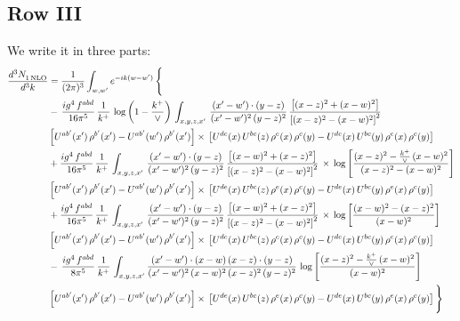 \documentclass[9pt]{article}
\numberwithin{equation}{section}
\begin{document}
\subsection{Row III}
We write it in three parts:
\begin{align}
   \frac{d^{3}N_{1\,\rm NLO}^{\rm}}{d^{3}k}  & =  \frac{1}{(2\pi)^{3}}  \int_{w, w^\prime} e^{-ik(w-w^\prime)}\, \Bigg\{\notag \\
& -\,\frac{ig^{4}\,f^{abd}}{16\pi^{5}}\,\frac{1}{k^{+}}\,\log{\left(1-\frac{k^{+}}{\vee}\right)}\,\int_{x,y,z,x'}\, \frac{(x'-w')\cdot (y-z)}{(x'-w')^{2}\,(y-z)^{2}}\,\frac{\left[(x-z)^{2}+(x-w)^{2}\right]}{\left[(x-z)^{2}-(x-w)^{2}\right]^{2}}\notag \\ & \left[U^{ab'}(x')\,\rho^{b'}(x')-U^{ab'}(w')\, \rho^{b'}(x')\right]\times\, \left[U^{de}(x)\,U^{bc}(z)\, \rho^{e}(x)\,\rho^{c}(y)-U^{de}(x)\,U^{bc}(y)\,\rho^{e}(x)\,\rho^{c}(y)\right] \notag \\
&  +\frac{ig^{4}\,f^{abd}}{16\pi^{5}}\, \frac{1}{k^{+}}\,\int_{x,y,z,x'}\, \frac{(x'-w')\cdot (y-z)}{(x'-w')^{2}\,(y-z)^{2}}\, \frac{\left[(x-w)^{2}+(x-z)^{2}\right]}{\left[(x-z)^{2}-(x-w)^{2}\right]^{2}}\, \times\, \log{\left[\frac{(x-z)^{2}-\frac{k^{+}}{\vee}\,(x-w)^{2}}{(x-z)^{2}-(x-w)^{2}}\right]}\notag \\ & \left[U^{ab'}(x')\,\rho^{b'}(x')-U^{ab'}(w')\, \rho^{b'}(x')\right]\times\, \left[U^{de}(x)\,U^{bc}(z)\, \rho^{e}(x)\,\rho^{c}(y)-U^{de}(x)\,U^{bc}(y)\,\rho^{e}(x)\,\rho^{c}(y)\right] \notag \\
&  +\frac{ig^{4}\,f^{abd}}{16\pi^{5}}\, \frac{1}{k^{+}}\,\int_{x,y,z,x'}\, \frac{(x'-w')\cdot (y-z)}{(x'-w')^{2}\,(y-z)^{2}}\, \frac{\left[(x-w)^{2}+(x-z)^{2}\right]}{\left[(x-z)^{2}-(x-w)^{2}\right]^{2}}\, \times\, \log{\left[\frac{(x-w)^{2}-(x-z)^{2}}{(x-w)^{2}}\right]}\notag \\ & \left[U^{ab'}(x')\,\rho^{b'}(x')-U^{ab'}(w')\, \rho^{b'}(x')\right]\times\, \left[U^{de}(x)\,U^{bc}(z)\, \rho^{e}(x)\,\rho^{c}(y)-U^{de}(x)\,U^{bc}(y)\,\rho^{e}(x)\,\rho^{c}(y)\right] \notag \\
&-\, \frac{ig^{4}\,f^{abd}}{8\pi^{5}}\,\frac{1}{k^{+}}\,\int_{x,y,z,x'}\frac{(x'-w')\cdot (x-w)\, (x-z)\cdot (y-z)}{(x'-w')^{2}\, (x-w)^{2}\, (x-z)^{2}\, (y-z)^{2}}\,\log{\left[\frac{(x-z)^{2}-\frac{k^{+}}{\vee}\,(x-w)^{2}}{(x-w)^{2}}\right]} \notag \\ & \left[U^{ab'}(x')\,\rho^{b'}(x')-U^{ab'}(w')\, \rho^{b'}(x')\right]\times\, \left[U^{de}(x)\,U^{bc}(z)\, \rho^{e}(x)\,\rho^{c}(y)-U^{de}(x)\,U^{bc}(y)\,\rho^{e}(x)\,\rho^{c}(y)\right]\Bigg\}
\end{align}
\end{document}
